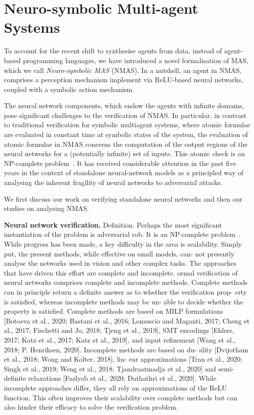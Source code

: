\documentclass{article}
\begin{document}
\section{Neuro-symbolic Multi-agent Systems}

To account for the recent shift to synthesise agents from data, instead of
agent-based programming languages, we have introduced a novel formalisation of
MAS, which we  call {\em Neuro-symbolic MAS} (NMAS). In a nutshell, an agent in
NMAS, comprises a perception mechanism implement via ReLU-based neural networks,
coupled with a symbolic action mechanism.  

The neural network components, which endow the agents with infinite domains,
pose significant  challenges to the verification of NMAS.  In particular, in
contrast to traditional verification for symbolic multiagent systems, where
atomic formulae are evaluated in constant time at symbolic states of the system,
the evaluation of atomic formulae in NMAS concerns the computation of the output
regions of the neural networks  for a (potentially infinite) set of inputs.
This atomic check is an NP-complete problem~\cite{Katz+17}. It has received
considerable attention in the past five years in the context of standalone
neural-network models as a principled way of analysing the inherent fragility of
neural networks to adversarial attacks.  

We first discuss our work on verifying standalone neural networks and then our
studies on analysing NMAS.


{\bf Neural network verification.} Definition. 
Perhaps the most significant instantiation of the problem is adversarial rob.
It is an NP-complete problem~\cite{Katz+17}. 
While progress has been made, a key difficulty in the area is scalability. Simply put,
the present methods, while effective on small models, can-
not presently analyse the networks used in vision and other
complex tasks. The approaches that have driven this effort are complete and incomplete.
ormal verification of neural networks comprises complete
and incomplete methods. Complete methods can in principle
return a definite answer as to whether the verification prop-
erty is satisfied, whereas incomplete methods may be un-
able to decide whether the property is satisfied. Complete
methods are based on MILP formulations [Botoeva et al.,
2020; Bastani et al., 2016; Lomuscio and Maganti, 2017;
Cheng et al., 2017; Fischetti and Jo, 2018; Tjeng et al.,
2019], SMT encodings [Ehlers, 2017; Katz et al., 2017;
Katz et al., 2019], and input refinement [Wang et al., 2018;
P. Henriksen, 2020]. Incomplete methods are based on du-
ality [Dvijotham et al., 2018; Wong and Kolter, 2018], lin-
ear approximations [Tran et al., 2020; Singh et al., 2019;
Weng et al., 2018; Tjandraatmadja et al., 2020] and semi-
definite relaxations [Fazlyab et al., 2020; Dathathri et al.,
2020]. While incomplete approaches differ, they all rely on
approximations of the ReLU function. This often improves
their scalability over complete methods but can also hinder
their efficacy to solve the verification problem.
\end{document}
